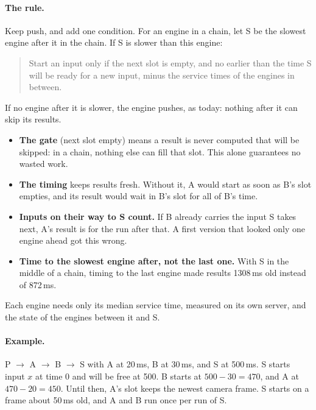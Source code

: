 \documentclass[11pt]{article}
\begin{document}
\paragraph{The rule.} Keep push, and add one condition. For an
engine in a chain, let S be the slowest engine after it in the chain. If S
is slower than this engine:
\begin{quote}
Start an input only if the next slot is empty, and no earlier than the time
S will be ready for a new input, minus the service times of the engines in
between.
\end{quote}
If no engine after it is slower, the engine pushes, as today: nothing after it
can skip its results.
\begin{itemize}[nosep]
  \item \textbf{The gate} (next slot empty) means a result is never computed
        that will be skipped: in a chain, nothing else can fill that slot.
        This alone guarantees no wasted work.
  \item \textbf{The timing} keeps results fresh. Without it, A would start
        as soon as B's slot empties, and its result would wait in B's slot
        for all of B's time.
  \item \textbf{Inputs on their way to S count.} If B already carries the
        input S takes next, A's result is for the run after that. A first
        version that looked only one engine ahead got this wrong.
  \item \textbf{Time to the slowest engine after, not the last one.} With S
        in the middle of a chain, timing to the last engine made results
        1308\,ms old instead of 872\,ms.
\end{itemize}
Each engine needs only its median service time, measured on its own server,
and the state of the engines between it and S.

\paragraph{Example.} P $\to$ A $\to$ B $\to$ S with A at 20\,ms, B at 30\,ms,
and S at 500\,ms. S starts input $x$ at time 0 and will be free at 500. B
starts at $500 - 30 = 470$, and A at $470 - 20 = 450$. Until then, A's slot
keeps the newest camera frame. S starts on a frame about 50\,ms old, and A
and B run once per run of S.
\end{document}
